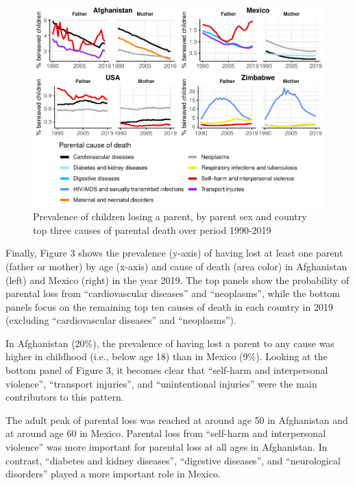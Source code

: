 \documentclass[
  11pt,
  letterpaper,
]{article}
\begin{document}
\begin{figure}
\centering
\includegraphics{parental_loss_global_paa_ext_abstract_files/figure-latex/perc-ber-top-1.pdf}
\caption{\label{fig:perc-ber-top}Prevalence of children losing a parent, by parent sex and country top three causes of parental death over period 1990-2019}
\end{figure}

Finally, Figure 3 shows the prevalence (y-axis) of having lost at least one parent (father or mother) by age (x-axis) and cause of death (area color) in Afghanistan (left) and Mexico (right) in the year 2019. The top panels show the probability of parental loss from ``cardiovascular diseases'' and ``neoplasms'', while the bottom panels focus on the remaining top ten causes of death in each country in 2019 (excluding ``cardiovascular diseases'' and ``neoplasms'').

In Afghanistan (20\%), the prevalence of having lost a parent to any cause was higher in childhood (i.e., below age 18) than in Mexico (9\%). Looking at the bottom panel of Figure 3, it becomes clear that ``self-harm and interpersonal violence'', ``transport injuries'', and ``unintentional injuries'' were the main contributors to this pattern.

The adult peak of parental loss was reached at around age 50 in Afghanistan and at around age 60 in Mexico. Parental loss from ``self-harm and interpersonal violence'' was more important for parental loss at all ages in Afghanistan. In contrast, ``diabetes and kidney diseases'', ``digestive diseases'', and ``neurological disorders'' played a more important role in Mexico.
\end{document}
